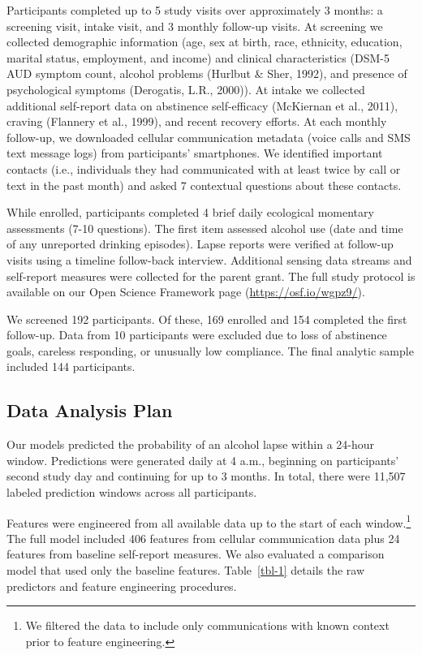\documentclass[
  letterpaper,
  DIV=11,
  numbers=noendperiod]{scrartcl}
\begin{document}
Participants completed up to 5 study visits over approximately 3 months:
a screening visit, intake visit, and 3 monthly follow-up visits. At
screening we collected demographic information (age, sex at birth, race,
ethnicity, education, marital status, employment, and income) and
clinical characteristics (DSM-5 AUD symptom count, alcohol problems
(Hurlbut \& Sher, 1992), and presence of psychological symptoms
(Derogatis, L.R., 2000)). At intake we collected additional self-report
data on abstinence self-efficacy (McKiernan et al., 2011), craving
(Flannery et al., 1999), and recent recovery efforts. At each monthly
follow-up, we downloaded cellular communication metadata (voice calls
and SMS text message logs) from participants' smartphones. We identified
important contacts (i.e., individuals they had communicated with at
least twice by call or text in the past month) and asked 7 contextual
questions about these contacts.

While enrolled, participants completed 4 brief daily ecological
momentary assessments (7-10 questions). The first item assessed alcohol
use (date and time of any unreported drinking episodes). Lapse reports
were verified at follow-up visits using a timeline follow-back
interview. Additional sensing data streams and self-report measures were
collected for the parent grant. The full study protocol is available on
our Open Science Framework page (\url{https://osf.io/wgpz9/}).

We screened 192 participants. Of these, 169 enrolled and 154 completed
the first follow-up. Data from 10 participants were excluded due to loss
of abstinence goals, careless responding, or unusually low compliance.
The final analytic sample included 144 participants.

\subsection{Data Analysis Plan}\label{data-analysis-plan}

Our models predicted the probability of an alcohol lapse within a
24-hour window. Predictions were generated daily at 4 a.m., beginning on
participants' second study day and continuing for up to 3 months. In
total, there were 11,507 labeled prediction windows across all
participants.

Features were engineered from all available data up to the start of each
window.\footnote{We filtered the data to include only communications
  with known context prior to feature engineering.} The full model
included 406 features from cellular communication data plus 24 features
from baseline self-report measures. We also evaluated a comparison model
that used only the baseline features. Table~\ref{tbl-1} details the raw
predictors and feature engineering procedures.
\end{document}
